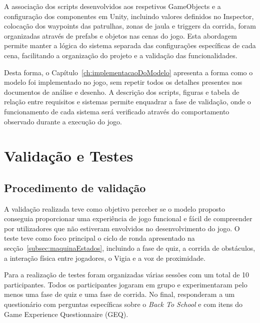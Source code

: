 A associação dos scripts desenvolvidos aos respetivos GameObjects e a configuração dos componentes em Unity, incluindo valores definidos no Inspector, colocação dos waypoints das patrulhas, zonas de jaula e triggers da corrida, foram organizadas através de prefabs e objetos nas cenas do jogo. Esta abordagem permite manter a lógica do sistema separada das configurações específicas de cada cena, facilitando a organização do projeto e a validação das funcionalidades.

Desta forma, o Capítulo~\ref{ch:implementacaoDoModelo} apresenta a forma como o modelo foi implementado no jogo, sem repetir todos os detalhes presentes nos documentos de análise e desenho. A descrição dos scripts, figuras e tabela de relação entre requisitos e sistemas permite enquadrar a fase de validação, onde o funcionamento de cada sistema será verificado através do comportamento observado durante a execução do jogo.




\chapter{Validação e Testes}
\label{ch:validacaoTestes}


\section{Procedimento de validação}
\label{sec:procedimentoValidacao}

A validação realizada teve como objetivo perceber se o modelo proposto conseguia proporcionar uma experiência de jogo funcional e fácil de compreender por utilizadores que não estiveram envolvidos no desenvolvimento do jogo. O teste teve como foco principal o ciclo de ronda apresentado na secção~\ref{subsec:maquinaEstados}, incluindo a fase de quiz, a corrida de obstáculos, a interação física entre jogadores, o Vigia e a voz de proximidade.

Para a realização de testes foram organizadas várias sessões com um total de 10 participantes. Todos os participantes jogaram em grupo e experimentaram pelo menos uma fase de quiz e uma fase de corrida. No final, responderam a um questionário com perguntas específicas sobre o \textit{Back To School} e com itens do Game Experience Questionnaire (GEQ).


